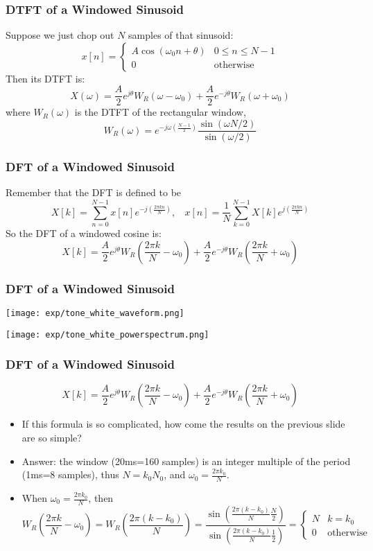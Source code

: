\documentclass{beamer}
\begin{document}
\begin{frame}
  \frametitle{DTFT of a Windowed Sinusoid}

  Suppose we just chop  out $N$ samples of that sinusoid:
  \[
  x[n]=\begin{cases}
  A\cos\left(\omega_0 n+\theta\right) & 0\le n\le N-1\\
  0 & \mbox{otherwise}
  \end{cases}
  \]
  Then its DTFT is:
  \[
  X(\omega) = \frac{A}{2}e^{j\theta}W_R(\omega-\omega_0)+\frac{A}{2}e^{-j\theta}W_R(\omega+\omega_0)
  \]
  where $W_R(\omega)$ is the DTFT of the rectangular window,
  \[
  W_R(\omega) = e^{-j\omega\left(\frac{N-1}{2}\right)}\frac{\sin(\omega N/2)}{\sin(\omega/2)}
  \]
\end{frame}

\begin{frame}
  \frametitle{DFT of a Windowed Sinusoid}

  Remember that the DFT is defined to be
  \[
  X[k]=\sum_{n=0}^{N-1}x[n]e^{-j\left(\frac{2\pi kn}{N}\right)},~~~~
  x[n]=\frac{1}{N}\sum_{k=0}^{N-1}X[k]e^{j\left(\frac{2\pi kn}{N}\right)}
  \]
  So the DFT of a windowed cosine is:
  \[
  X[k] = \frac{A}{2}e^{j\theta}W_R\left(\frac{2\pi k}{N}-\omega_0\right)+
  \frac{A}{2}e^{-j\theta}W_R\left(\frac{2\pi k}{N}+\omega_0\right)
  \]
\end{frame}

\begin{frame}
  \frametitle{DFT of a Windowed Sinusoid}
  \centerline{\texttt{[image: exp/tone\_white\_waveform.png]}}
  \centerline{\texttt{[image: exp/tone\_white\_powerspectrum.png]}}
\end{frame}

\begin{frame}
  \frametitle{DFT of a Windowed Sinusoid}
  \[
  X[k] = \frac{A}{2}e^{j\theta}W_R\left(\frac{2\pi k}{N}-\omega_0\right)+
  \frac{A}{2}e^{-j\theta}W_R\left(\frac{2\pi k}{N}+\omega_0\right)
  \]
  \begin{itemize}
  \item If this formula is so complicated, how come the results on the
    previous slide are so simple?
  \item Answer: the window (20ms=160 samples) is an integer multiple of
    the period (1ms=8 samples), thus $N=k_0 N_0$, and $\omega_0=\frac{2\pi k_0}{N}$.
  \item When $\omega_0=\frac{2\pi k_0}{N}$, then
    \[
    W_R\left(\frac{2\pi k}{N}-\omega_0\right) = W_R\left(\frac{2\pi (k-k_0)}{N}\right)
    =
    \frac{\sin\left(\frac{2\pi (k-k_0)}{N}\frac{N}{2}\right)}{\sin\left(\frac{2\pi (k-k_0)}{N}\frac{1}{2}\right)}
    =\begin{cases}
    N & k=k_0\\
    0 & \mbox{otherwise}
    \end{cases}
    \]
  \end{itemize}
\end{frame}
\end{document}
